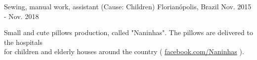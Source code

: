 

\begin{cventries}

  \cventry
    {Sewing, manual work, assistant (Cause: Children)} %
    {} %
    {Florianópolis, Brazil} %
    {Nov. 2015 - Nov. 2018} %
    {
      \begin{cvitems} %
        \item {Small and cute pillows production, called "Naninhas". The pillows are delivered to the hospitals \\
	for children and elderly houses around the country ( \href{https://www.facebook.com/Naninhasdobemflorianopolis/}{facebook.com/Naninhas} ).}
      \end{cvitems}
    }

\end{cventries}
